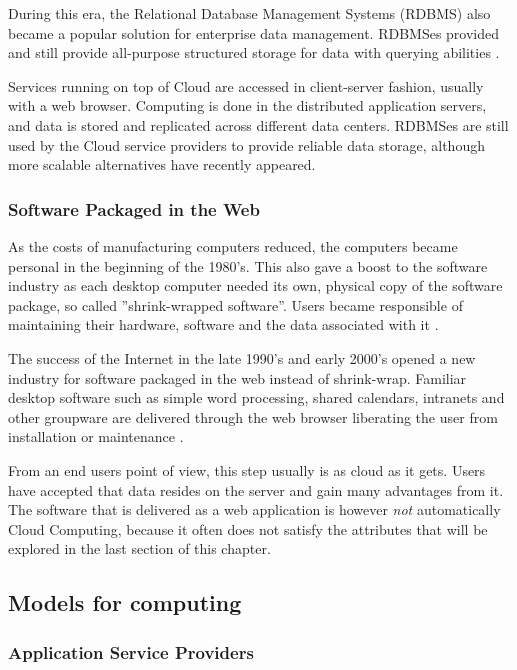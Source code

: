 \documentclass{tktltiki}
\begin{document}
During this era, the Relational Database Management Systems (RDBMS) also became a popular solution for enterprise data management.  RDBMSes provided and still provide all-purpose structured storage for data with querying abilities \cite{ClientServer96}.

Services running on top of Cloud are accessed in client-server fashion, usually with a web browser.  Computing is done in the distributed application servers, and data is stored and replicated across different data centers.  RDBMSes are still used by the Cloud service providers to provide reliable data storage, although more scalable alternatives have recently appeared. 


\subsubsection{Software Packaged in the Web}

As the costs of manufacturing computers reduced, the computers became personal in the beginning of the 1980's.  This also gave a boost to the software industry as each desktop computer needed its own, physical copy of the software package, so called ''shrink-wrapped software''.  Users became responsible of maintaining their hardware, software and the data associated with it \cite{CloudComputing}. 

The success of the Internet in the late 1990's and early 2000's opened a new industry for software packaged in the web instead of shrink-wrap.  Familiar desktop software such as simple word processing, shared calendars, intranets and other groupware are delivered through the web browser liberating the user from installation or maintenance \cite{Cusumano10}.

From an end users point of view, this step usually is as cloud as it gets.  Users have accepted that data resides on the server and gain many advantages from it.  The software that is delivered as a web application is however \emph{not} automatically Cloud Computing, because it often does not satisfy the attributes that will be explored in the last section of this chapter.


\subsection{Models for computing}


\subsubsection{Application Service Providers}
\end{document}
